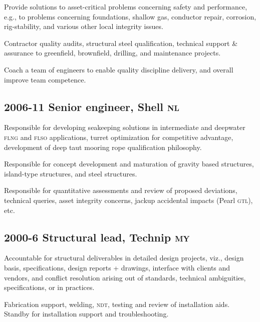
Provide solutions to asset-critical problems concerning safety and performance, e.g., to problems concerning foundations, shallow gas, conductor repair, corrosion, rig-stability, and various other local integrity issues.

Contractor quality audits, structural steel qualification, technical support \& assurance to greenfield, brownfield, drilling, and maintenance projects. %


Coach a team of engineers to enable quality discipline delivery, and overall improve team competence.


\subsection*{2006-11 Senior engineer, Shell \textsc{nl}} %
\label{sub:c4}

Responsible for developing seakeeping solutions in intermediate and deepwater \textsc{flng} and \textsc{flso} applications, turret optimization for competitive advantage, development of deep taut mooring rope qualification philosophy.

Responsible for concept development and maturation of gravity based structures, island-type structures, and steel structures.

Responsible for quantitative assessments and review of proposed deviations, technical queries, asset integrity concerns, jackup accidental impacts (Pearl \textsc{gtl}), etc.


\subsection*{2000-6 Structural lead, Technip \textsc{my}} %
\label{sub:c5}

Accountable for structural deliverables in detailed design projects, viz., design basis, specifications, design reports + drawings, interface with clients and vendors, and conflict resolution arising out of standards, technical ambiguities, specifications, or in practices.

Fabrication support, welding, \textsc{ndt}, testing and review of installation aids. Standby for installation support and troubleshooting.


